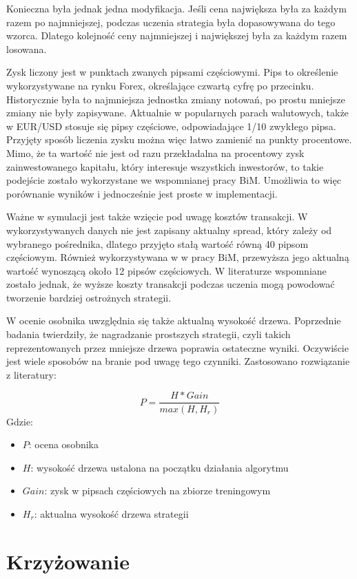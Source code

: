 \documentclass[twoside]{iisthesis}
\begin{document}
Konieczna była jednak jedna modyfikacja. Jeśli cena największa była za każdym razem po najmniejszej, podczas uczenia strategia była dopasowywana do tego wzorca. Dlatego kolejność ceny najmniejszej i największej była za każdym razem losowana.

Zysk liczony jest w punktach zwanych pipsami częściowymi. Pips to określenie wykorzystywane na rynku Forex, określające czwartą cyfrę po przecinku. Historycznie była to najmniejsza jednostka zmiany notowań, po prostu mniejsze zmiany nie były zapisywane. Aktualnie w popularnych parach walutowych, także w EUR/USD stosuje się pipsy częściowe, odpowiadające 1/10 zwykłego pipsa. Przyjęty sposób liczenia zysku można więc łatwo zamienić na punkty procentowe. Mimo, że ta wartość nie jest od razu przekładalna na procentowy zysk zainwestowanego kapitału, który interesuje wszystkich inwestorów, to takie podejście zostało wykorzystane we wspomnianej pracy BiM. Umożliwia to więc porównanie wyników i jednocześnie jest proste w implementacji.

Ważne w symulacji jest także wzięcie pod uwagę kosztów transakcji. W wykorzystywanych danych nie jest zapisany aktualny spread, który zależy od wybranego pośrednika, dlatego przyjęto stałą wartość równą 40 pipsom częściowym. Również wykorzystywana w w pracy BiM, przewyższa jego aktualną wartość wynoszącą około 12 pipsów częściowych. W literaturze wspomniane zostało jednak, że wyższe koszty transakcji podczas uczenia mogą powodować tworzenie bardziej ostrożnych strategii. 

W ocenie osobnika uwzględnia się także aktualną wysokość drzewa. Poprzednie badania twierdziły, że nagradzanie prostszych strategii, czyli takich reprezentowanych przez mniejsze drzewa poprawia ostateczne wyniki. Oczywiście jest wiele sposobów na branie pod uwagę tego czynniki. Zastosowano rozwiązanie z literatury:

\[P = \frac{H * Gain}{max(H, H_r)}\]
Gdzie:
\begin{itemize}[label=]
	\item $P$: ocena osobnika
	\item $H$: wysokość drzewa ustalona na początku działania algorytmu
	\item $Gain$: zysk w pipsach częściowych na zbiorze treningowym
	\item $H_r$: aktualna wysokość drzewa strategii
\end{itemize}

\section {Krzyżowanie}
\end{document}
